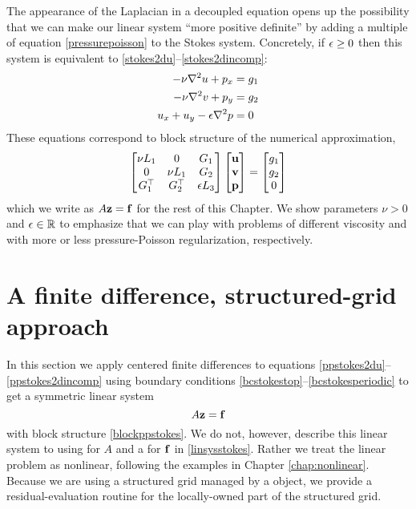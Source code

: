 The appearance of the Laplacian in a decoupled equation opens up the possibility that we can make our linear system ``more positive definite'' by adding a multiple of equation \eqref{pressurepoisson} to the Stokes system.  Concretely, if $\epsilon\ge 0$ then this system is equivalent to \eqref{stokes2du}--\eqref{stokes2dincomp}:
\begin{align}
-\nu \nabla^2 u + p_x &= g_1 \label{ppstokes2du} \\
-\nu \nabla^2 v + p_y &= g_2 \label{ppstokes2dv} \\
u_x + u_y - \epsilon \nabla^2 p &= 0 \label{ppstokes2dincomp}
\end{align}
These equations correspond to block structure of the numerical approximation,
\begin{equation}
\begin{bmatrix}
    \nu L_1 & 0 & G_1 \\
    0 & \nu L_1 & G_2 \\
    G_1^\top & G_2^\top & \epsilon L_3
    \end{bmatrix}
    \begin{bmatrix}
    \mathbf{u} \\ \mathbf{v} \\ \mathbf{p}
    \end{bmatrix}
    =
    \begin{bmatrix}
    g_1 \\ g_2 \\ 0
    \end{bmatrix} \label{blockppstokes}
\end{equation}
which we write as $A\mathbf{z} = \mathbf{f}$ for the rest of this Chapter.  We show parameters $\nu>0$ and $\epsilon \in \mathbb{R}$ to emphasize that we can play with problems of different viscosity and with more or less pressure-Poisson regularization, respectively. 


\section{A finite difference, structured-grid approach}

In this section we apply centered finite differences to equations \eqref{ppstokes2du}--\eqref{ppstokes2dincomp} using boundary conditions \eqref{bcstokestop}--\eqref{bcstokesperiodic} to get a symmetric linear system
\begin{equation}
  A \mathbf{z} = \mathbf{f} \label{linsysstokes}
\end{equation}
with block structure \eqref{blockppstokes}.  We do not, however, describe this linear system to \PETSc using \pMat for $A$ and a \pVec for $\mathbf{f}$ in \eqref{linsysstokes}.  Rather we treat the linear problem as nonlinear, following the examples in Chapter \ref{chap:nonlinear}.  Because we are using a structured grid managed by a \PETSc \pDMDA object, we provide a residual-evaluation routine for the locally-owned part of the structured grid.

